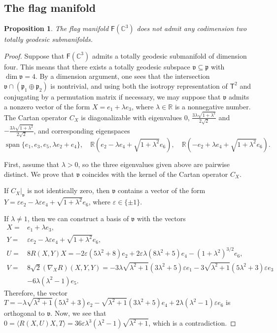 \documentclass[11pt,a4paper,final]{amsart}
\newcommand{\g}{\mathfrak}
\newcommand{\R}{\mathbb{R}}
\newcommand{\C}{\mathbb{C}}
\newcommand{\vecspan}{\operatorname{span}}
\newtheorem{proposition}[theorem]{Proposition}
\theoremstyle{definition}
\begin{document}
\subsection{The flag manifold}\label{subsec:flagproof}
\begin{proposition}
	\label{prop:4tgflag}
	The flag manifold $\mathsf{F}(\C^{3})$ does not admit any codimension two totally geodesic submanifolds.
\end{proposition}
\begin{proof}
	Suppose that $\mathsf{F}(\C^{3})$ admits a totally geodesic submanifold of dimension four.
	This means that there exists a totally geodesic subspace $\g{v}\subseteq\g{p}$ with $\dim \g{v}=4$.
	By a dimension argument, one sees that the intersection $\g{v}\cap(\g{p}_{1}\oplus\g{p}_{2})$ is nontrivial, and using both the isotropy representation of $\mathsf{T}^2$ and conjugating by a permutation matrix if necessary, we may suppose that $\g{v}$ admits a nonzero vector of the form $X=e_{1}+\lambda e_{3}$, where $\lambda\in \R$ is a nonnegative number.
	The Cartan operator $C_{X}$ is diagonalizable with eigenvalues $0$, $\frac{3\lambda\sqrt{1+\lambda^{2}}}{2\sqrt{2}}$ and $-\frac{3\lambda\sqrt{1+\lambda^{2}}}{2\sqrt{2}}$,
	and corresponding eigenspaces
	\[
		\vecspan\{e_{1},e_{3},e_{5},\lambda e_{2}+e_{4}\},\quad \R\left(e_{2}-\lambda e_{4}+\sqrt{1+\lambda^{2}}e_{6}\right), \quad \R\left(-e_{2}+\lambda e_{4}+\sqrt{1+\lambda^{2}}e_{6}\right).
	\]
		
	First, assume that $\lambda > 0$, so the three eigenvalues given above are pairwise distinct.
	We prove that $\g{v}$ coincides with the kernel of the Cartan operator $C_{X}$.
		
	If $C_{X}\vert_{\g{v}}$ is not identically zero, then $\g{v}$ contains a vector of the form $Y=\varepsilon e_{2}-\lambda \varepsilon e_{4}+\sqrt{1+\lambda^{2}}e_{6}$, where $\varepsilon \in \{\pm 1\}$.
		
	If $\lambda \neq 1$, then we can construct a basis of $\g{v}$ with the vectors
	\begin{align*}
		X={}&e_{1}+\lambda e_{3}, \\
		Y={}&\varepsilon e_{2}-\lambda \varepsilon e_{4}+\sqrt{1+\lambda^{2}}e_{6}, \\
		U={}&8R(X,Y)X=-2\varepsilon \left(5\lambda^{2}+8\right)e_{2}+2\varepsilon\lambda\left(8\lambda^{2}+5\right)e_{4}-\left(1+\lambda^{2}\right)^{3/2}e_{6}, \\
		V={}&8\sqrt{2}(\nabla_{X}R)(X,Y,Y)=-3 \lambda  \sqrt{\lambda ^2+1} \left(3 \lambda ^2+5\right) \varepsilon e_{1}-3 \sqrt{\lambda ^2+1} \left(5 \lambda ^2+3\right) \varepsilon e_{3}\\
		&-6 \lambda  \left(\lambda ^2-1\right)e_{5}.
	\end{align*}
	Therefore, the vector $T=-\lambda  \sqrt{\lambda ^2+1} \left(5 \lambda ^2+3\right) e_{2}-\sqrt{\lambda ^2+1} \left(3 \lambda ^2+5\right) e_{4}+2 \lambda  \left(\lambda ^2-1\right) \varepsilon e_{6}$ is orthogonal to $\g{v}$. 
	Now, we see that $0=\langle R(X,U)X,T \rangle=36 \varepsilon\lambda ^3 \left(\lambda ^2-1\right) \sqrt{\lambda ^2+1}$, which is a contradiction.
	

\end{proof}
\end{document}
